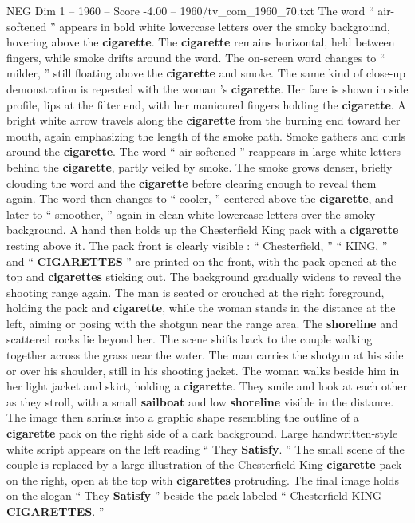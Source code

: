 \begin{textsample}{NEG Dim 1 – 1960 – Score -4.00 – 1960/tv\_com\_1960\_70.txt}
The word “ air-softened ” appears in bold white lowercase letters over the smoky background, hovering above the \textbf{cigarette}.
The \textbf{cigarette} remains horizontal, held between fingers, while smoke drifts around the word.
The on-screen word changes to “ milder, ” still floating above the \textbf{cigarette} and smoke.
The same kind of close-up demonstration is repeated with the woman ’s \textbf{cigarette}.
Her face is shown in side profile, lips at the filter end, with her manicured fingers holding the \textbf{cigarette}.
A bright white arrow travels along the \textbf{cigarette} from the burning end toward her mouth, again emphasizing the length of the smoke path.
Smoke gathers and curls around the \textbf{cigarette}.
The word “ air-softened ” reappears in large white letters behind the \textbf{cigarette}, partly veiled by smoke.
The smoke grows denser, briefly clouding the word and the \textbf{cigarette} before clearing enough to reveal them again.
The word then changes to “ cooler, ” centered above the \textbf{cigarette}, and later to “ smoother, ” again in clean white lowercase letters over the smoky background.
A hand then holds up the Chesterfield King pack with a \textbf{cigarette} resting above it.
The pack front is clearly visible : “ Chesterfield, ” “ KING, ” and “ \textbf{CIGARETTES} ” are printed on the front, with the pack opened at the top and \textbf{cigarettes} sticking out.
The background gradually widens to reveal the shooting range again.
The man is seated or crouched at the right foreground, holding the pack and \textbf{cigarette}, while the woman stands in the distance at the left, aiming or posing with the shotgun near the range area.
The \textbf{shoreline} and scattered rocks lie beyond her.
The scene shifts back to the couple walking together across the grass near the water.
The man carries the shotgun at his side or over his shoulder, still in his shooting jacket.
The woman walks beside him in her light jacket and skirt, holding a \textbf{cigarette}.
They smile and look at each other as they stroll, with a small \textbf{sailboat} and low \textbf{shoreline} visible in the distance.
The image then shrinks into a graphic shape resembling the outline of a \textbf{cigarette} pack on the right side of a dark background.
Large handwritten-style white script appears on the left reading “ They \textbf{Satisfy}. ” The small scene of the couple is replaced by a large illustration of the Chesterfield King \textbf{cigarette} pack on the right, open at the top with \textbf{cigarettes} protruding.
The final image holds on the slogan “ They \textbf{Satisfy} ” beside the pack labeled “ Chesterfield KING \textbf{CIGARETTES}. ”

\end{textsample}
